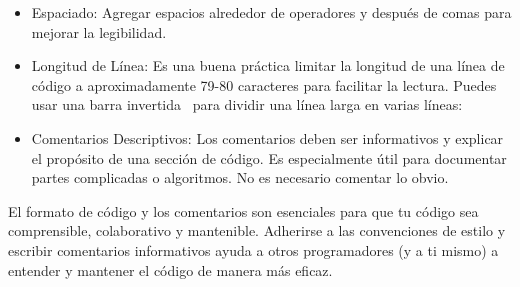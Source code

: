 \begin{itemize}
    \item Espaciado: Agregar espacios alrededor de operadores y después de comas para mejorar la legibilidad.
\newpage
    \begin{figure}[h]
        \centering
      \end{figure}
    \item Longitud de Línea: Es una buena práctica limitar la longitud de una línea de código a aproximadamente 79-80 caracteres para facilitar la lectura. Puedes usar una barra invertida \ para dividir una línea larga en varias líneas:
    \begin{figure}[h]
        \centering
      \end{figure}
    \item Comentarios Descriptivos: Los comentarios deben ser informativos y explicar el propósito de una sección de código. Es especialmente útil para documentar partes complicadas o algoritmos. No es necesario comentar lo obvio.
\end{itemize}

El formato de código y los comentarios son esenciales para que tu código sea comprensible, colaborativo y mantenible. Adherirse a las convenciones de estilo y escribir comentarios informativos ayuda a otros programadores (y a ti mismo) a entender y mantener el código de manera más eficaz.
